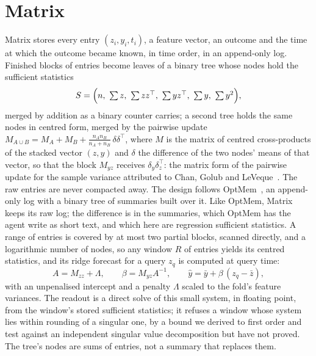 \documentclass[11pt]{article}
\begin{document}
\section{Matrix}\label{sec:matrix}

Matrix stores every entry $(z_i, y_i, t_i)$, a feature vector, an outcome and the time at which the
outcome became known, in time order, in an append-only log. Finished blocks of entries become leaves
of a binary tree whose nodes hold the sufficient statistics
\[
S = \Bigl(n,\ \textstyle\sum z,\ \sum z z^\top,\ \sum y z^\top,\ \sum y,\ \sum y^2\Bigr),
\]
merged by addition as a binary counter carries; a second tree holds the same nodes in centred form,
merged by the pairwise update $M_{A \cup B} = M_A + M_B + \tfrac{n_A n_B}{n_A + n_B}\,\delta\delta^\top$, where $M$ is
the matrix of centred cross-products of the stacked vector $(z, y)$ and $\delta$ the difference of
the two nodes' means of that vector, so that the block $M_{yz}$ receives $\delta_y\delta_z^\top$: the
matrix form of the pairwise update for the sample variance attributed to Chan, Golub and
LeVeque~\cite{chan1983}. %
The raw entries are never compacted away. The design follows OptMem~\cite{optmem}, %
an append-only log with a binary tree of summaries built over it. Like OptMem, Matrix keeps its raw
log; the difference is in the summaries, which OptMem has the agent write as short text, and which
here are regression sufficient statistics. A range of entries is covered by at most two partial blocks, scanned directly, and a
logarithmic number of nodes, so any window $R$ of entries yields its centred statistics, and its
ridge forecast for a query $z_q$ is computed at query time:
\[
A = M_{zz} + \Lambda,\qquad \beta = M_{yz} A^{-1},\qquad \hat y = \bar y + \beta\,(z_q - \bar z),
\]
with an unpenalised intercept and a penalty $\Lambda$ scaled to the fold's feature variances. The
readout is a direct solve of this small system, in floating point, from the window's stored
sufficient statistics; it refuses a window whose system lies within rounding of a singular one, by a bound we derived to first order and test
against an independent singular value decomposition but have not proved. The tree's nodes are sums
of entries, not a summary that replaces them.
\end{document}
